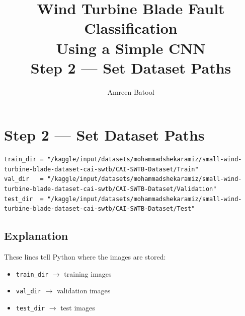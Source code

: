 \documentclass[12pt]{article}
\title{\textbf{Wind Turbine Blade Fault Classification\\Using a Simple CNN}\\[0.5em]
\large Step 2 --- Set Dataset Paths}
\author{Amreen Batool}
\date{}
\begin{document}
\maketitle

\section*{Step 2 --- Set Dataset Paths}

\begin{lstlisting}[style=pythonstyle]
train_dir = "/kaggle/input/datasets/mohammadshekaramiz/small-wind-turbine-blade-dataset-cai-swtb/CAI-SWTB-Dataset/Train"
val_dir   = "/kaggle/input/datasets/mohammadshekaramiz/small-wind-turbine-blade-dataset-cai-swtb/CAI-SWTB-Dataset/Validation"
test_dir  = "/kaggle/input/datasets/mohammadshekaramiz/small-wind-turbine-blade-dataset-cai-swtb/CAI-SWTB-Dataset/Test"
\end{lstlisting}

\subsection*{Explanation}

These lines tell Python where the images are stored:

\begin{itemize}
    \item \texttt{train\_dir} $\rightarrow$ training images
    \item \texttt{val\_dir} $\rightarrow$ validation images
    \item \texttt{test\_dir} $\rightarrow$ test images
\end{itemize}
\end{document}
